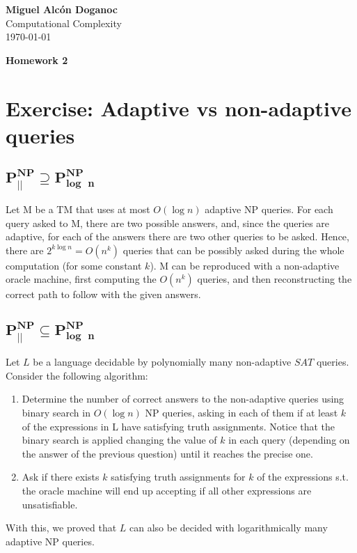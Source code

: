 \documentclass[a4paper, 10pt]{article}
\begin{document}
\noindent
\begin{flushright}
    \large\textbf{Miguel Alcón Doganoc} \\
    Computational Complexity \\
    \today
\end{flushright}

\noindent
{\huge{\textbf{Homework 2}}}

\section{Exercise: Adaptive vs non-adaptive queries}
\subsection{$\mathbf{P_{||}^{NP} \supseteq \mathbf{P_{log\text{ }n}^{NP}}}$}
Let M be a TM that uses at most $O(\log n)$ adaptive NP queries. For each query asked to M, there are two possible answers, and, since the queries are adaptive, for each of the answers there are two other queries to be asked. Hence, there are $2^{k\log n} = O(n^k)$ queries that can be possibly asked during the whole computation (for some constant $k$). M can be reproduced with a non-adaptive oracle machine, first computing the $O(n^k)$ queries, and then reconstructing the correct path to follow with the given answers.

\subsection{$\mathbf{P_{||}^{NP} \subseteq \mathbf{P_{log\text{ }n}^{NP}}}$}
Let $L$ be a language decidable by polynomially many non-adaptive $SAT$ queries. Consider the following algorithm: 
\begin{enumerate}
    \item Determine the number of correct answers to the non-adaptive queries using binary search in $O(\log n)$ NP queries, asking in each of them if at least $k$ of the expressions in L have satisfying truth assignments. Notice that the binary search is applied changing the value of $k$ in each query (depending on the answer of the previous question) until it reaches the precise one.
    \item Ask if there exists $k$ satisfying truth assignments for $k$ of the expressions s.t. the oracle machine will end up accepting if all other expressions are unsatisfiable.
\end{enumerate}
With this, we proved that $L$ can also be decided with logarithmically many adaptive NP queries.
\end{document}
